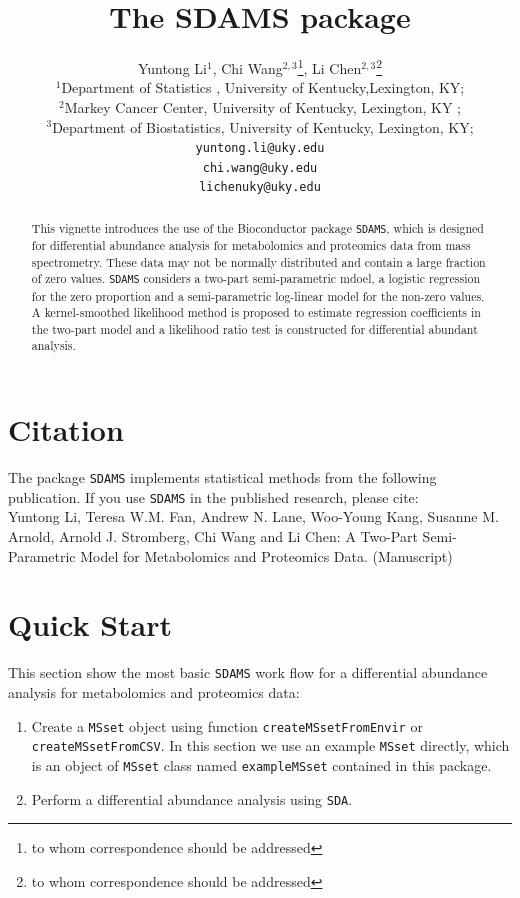 \documentclass[12pt]{article}
\author{Yuntong Li$^{1}$, Chi Wang$^{2,3}$\footnote{to whom correspondence
should be addressed}, Li Chen$^{2,3}$\footnote{to whom correspondence
should be addressed}\\[1em]
\small{$^{1}$Department of Statistics , University of Kentucky,Lexington, KY;}\\
\small{$^{2}$Markey Cancer Center, University of Kentucky, Lexington, KY ;}\\
\small{$^{3}$Department of Biostatistics, University of Kentucky,
Lexington, KY;}\\
\small{\texttt{yuntong.li@uky.edu}}\\
\small{\texttt{chi.wang@uky.edu}}\\
\small{\texttt{lichenuky@uky.edu}}}
\title{\textsf{\textbf{The SDAMS package}}}
\begin{document}

\maketitle

\begin{abstract}
This vignette introduces the use of the Bioconductor package
{\tt SDAMS}, which is designed for differential abundance analysis for
metabolomics and proteomics data from mass spectrometry. These data may not be
normally distributed and contain a large fraction of zero values. {\tt SDAMS}
considers a two-part semi-parametric mdoel, a logistic regression for the zero
proportion and a semi-parametric log-linear model for the non-zero values. A
kernel-smoothed likelihood method is proposed to estimate regression
coefficients in the two-part model and a likelihood ratio test is constructed
for differential abundant analysis.

\end{abstract}


\newpage

\tableofcontents

\newpage


\section{Citation}
The package {\tt SDAMS} implements statistical methods from the following
publication. If you use {\tt SDAMS} in the published research, please cite: \\
Yuntong Li, Teresa W.M. Fan, Andrew N. Lane, Woo-Young Kang, Susanne M. Arnold,
Arnold J. Stromberg, Chi Wang and Li Chen: A Two-Part Semi-Parametric Model for
Metabolomics and Proteomics Data. (Manuscript)

\section{Quick Start}
This section show the most basic {\tt SDAMS} work flow for a differential
abundance analysis for metabolomics and proteomics data:
\begin{enumerate}
\item Create a {\tt MSset} object using function {\tt createMSsetFromEnvir} or
      {\tt createMSsetFromCSV}.
      In this section we use an example {\tt MSset} directly, which is an object
      of {\tt MSset} class named {\tt exampleMSset} contained in this package.
\item Perform a differential abundance analysis using {\tt SDA}.
\end{enumerate}
\end{document}
